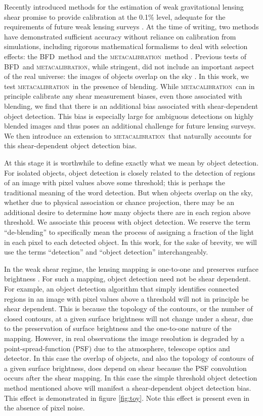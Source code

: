 \documentclass[fleqn,useAMS,usenatbib]{mnras}
\newcommand{\mcal}{\textsc{metacalibration}}
\newcommand{\bfd}{\textsc{BFD}}
\begin{document}
Recently introduced methods for the estimation of weak gravitational lensing
shear promise to provide calibration at the 0.1\% level, adequate for the
requirements of future weak lensing surveys \citep[e.g.,][]{huterer2006}.  At
the time of writing, two methods have demonstrated sufficient accuracy without
reliance on calibration from simulations, including rigorous mathematical
formalisms to deal with selection effects:  the \bfd\ method
\citep{BernBFD2016} and the \mcal\ method \citep{HuffMcal2017,SheldonMcal2017}.
Previous tests of \bfd\ and \mcal, while stringent, did not include an
important aspect of the real universe: the images of objects overlap on the sky
\citep[for discussion of blending effects see, e.g.,][]{DawsonBlending2016}. In
this work, we test \mcal\ in the presence of blending. While \mcal\ can in
principle calibrate any shear measurement biases, even those associated with
blending, we find that there is an additional bias associated with
shear-dependent object detection. This bias is especially large for ambiguous
detections on highly blended images and thus poses an additional challenge for
future lensing surveys. We then introduce an extension to \mcal\ that naturally
accounts for this shear-dependent object detection bias.

At this stage it is worthwhile to define exactly what we mean by object
detection.  For isolated objects, object detection is closely related to the
detection of regions of an image with pixel values above some threshold; this is
perhaps the traditional meaning of the word detection. But when objects overlap
on the sky, whether due to physical association or chance projection, there may
be an additional desire to determine how many objects there are in each region
above threshold. We associate this process with object detection.  We reserve
the term ``de-blending'' to specifically mean the process of assigning a
fraction of the light in each pixel to each detected object.  In this work, for
the sake of brevity, we will use the terms ``detection'' and ``object
detection'' interchangeably.

In the weak shear regime, the lensing mapping is one-to-one and preserves
surface brightness \citep{SchneiderBook92}. For such a mapping, object
detection need not be shear dependent. For example, an object detection
algorithm that simply identifies connected regions in an image with pixel
values above a threshold will not in principle be shear dependent.  This is
because the topology of the contours, or the number of closed contours, at a
given surface brightness will not change under a shear, due to the preservation
of surface brightness and the one-to-one nature of the mapping.  However, in
real observations the image resolution is degraded by a point-spread-function
(PSF) due to the atmosphere, telescope optics and detector. In this case the
overlap of objects, and also the topology of contours of a given surface
brightness, does depend on shear because the PSF convolution occurs after the
shear mapping.  In this case the simple threshold object detection method
mentioned above will manifest a shear-dependent object detection bias. This
effect is demonstrated in figure \ref{fig:toy}.  Note this effect is present
even in the absence of pixel noise.
\end{document}
